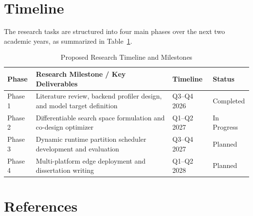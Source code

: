 \documentclass[11pt,a4paper]{article}
\begin{document}
\section{Timeline}
The research tasks are structured into four main phases over the next two academic years, as summarized in Table~\ref{tab:timeline}.

\begin{table}[htbp]
    \centering
    \caption{Proposed Research Timeline and Milestones}
    \label{tab:timeline}
    \vspace{0.2cm}
    \begin{tabularx}{\linewidth}{l X l l}
        \toprule
        \textbf{Phase} & \textbf{Research Milestone / Key Deliverables} & \textbf{Timeline} & \textbf{Status} \\
        \midrule
        Phase 1 & Literature review, backend profiler design, and model target definition & Q3--Q4 2026 & Completed \\
        Phase 2 & Differentiable search space formulation and co-design optimizer & Q1--Q2 2027 & In Progress \\
        Phase 3 & Dynamic runtime partition scheduler development and evaluation & Q3--Q4 2027 & Planned \\
        Phase 4 & Multi-platform edge deployment and dissertation writing & Q1--Q2 2028 & Planned \\
        \bottomrule
    \end{tabularx}
\end{table}

\section{References}
\printbibliography[heading=none]
\end{document}
